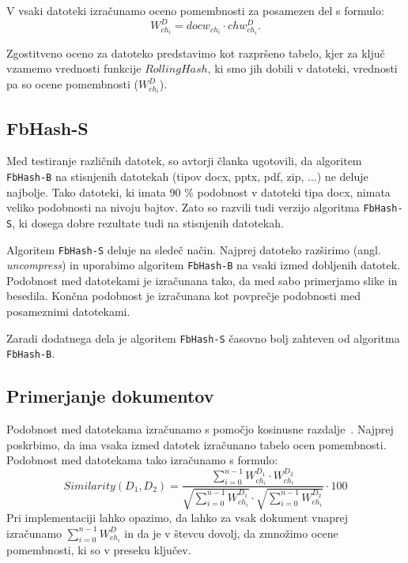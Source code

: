 \documentclass{acm_proc_article-sp}
\begin{document}
V vsaki datoteki izračunamo oceno pomembnosti za posamezen del s formulo: \begin{displaymath}  W_{ch_i}^D = docw_{ch_i} \cdot chw_{ch_i}^D. \end{displaymath}

Zgostitveno oceno za datoteko predstavimo kot razpršeno tabelo, kjer za ključ vzamemo vrednosti funkcije $RollingHash$, ki smo jih dobili v datoteki, vrednosti pa so ocene pomembnosti ($W_{ch_i}^D$).

\subsection{FbHash-S}

Med testiranje različnih datotek, so avtorji članka ugotovili, da algoritem \texttt{FbHash-B} na stisnjenih datotekah (tipov docx, pptx, pdf, zip, ...) ne deluje najbolje. Tako datoteki, ki imata $90$ \% podobnost v datoteki tipa docx, nimata veliko podobnosti na nivoju bajtov. Zato so razvili tudi verzijo algoritma \texttt{FbHash-S}, ki dosega dobre rezultate tudi na stisnjenih datotekah.

Algoritem \texttt{FbHash-S} deluje na sledeč način. Najprej datoteko razširimo (angl. \emph{uncompress}) in uporabimo algoritem \texttt{FbHash-B} na vsaki izmed dobljenih datotek. Podobnost med datotekami je izračunana tako, da med sabo primerjamo slike in besedila. Končna podobnost je izračunana kot povprečje podobnosti med posameznimi datotekami.

Zaradi dodatnega dela je algoritem \texttt{FbHash-S} časovno bolj zahteven od algoritma \texttt{FbHash-B}.

\subsection{Primerjanje dokumentov}
\label{doc-compare}

Podobnost med datotekama izračunamo s pomočjo kosinusne razdalje~\cite{Salton88term-weightingapproaches}. Najprej poskrbimo, da ima vsaka izmed datotek izračunano tabelo ocen pomembnosti. Podobnost med datotekama tako izračunamo s formulo: \begin{displaymath} Similarity(D_1, D_2)=\frac{\sum_{i=0}^{n-1} W_{ch_i}^{D_1} \cdot W_{ch_i}^{D_2}}{\sqrt{\sum_{i=0}^{n-1} W_{ch_i}^{D_1}}\cdot\sqrt{\sum_{i=0}^{n-1} W_{ch_i}^{D_2}}}\cdot100 \end{displaymath} Pri implementaciji lahko opazimo, da lahko za vsak dokument vnaprej izračunamo $\sum_{i=0}^{n-1} W_{ch_i}^{D}$ in da je v števcu dovolj, da zmnožimo ocene pomembnosti, ki so v preseku ključev.
\end{document}
